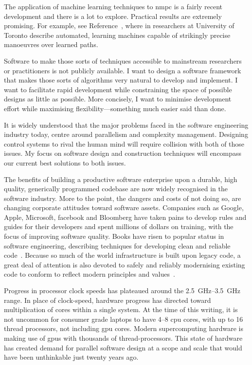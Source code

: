 The application of machine learning techniques to \ac{nmpc} is a fairly recent
development and there is a lot to explore. Practical results are extremely
promising. For example, see Reference~\cite{Ostafew2016}, where in researchers
at University of Toronto describe automated, learning machines capable of
strikingly precise manoeuvres over learned paths.

Software to make those sorts of techniques accessible to mainstream researchers
or practitioners is not publicly available. I want to design a software
framework that makes those sorts of algorithms very natural to develop and
implement. I want to facilitate rapid development while constraining the space
of possible designs as little as possible. More concisely, I want to minimise
development effort while maximising flexibility—something much easier said than
done.

It is widely understood that the major problems faced in the software
engineering industry today, centre around parallelism and complexity management.
Designing control systems to rival the human mind will require collision with
both of those issues. My focus on software design and construction techniques
will encompass our current best solutions to both issues.



\sAsterism%


The benefits of building a productive software enterprise upon a durable, high
quality, generically programmed codebase are now widely recognised in the
software industry. More to the point, the dangers and costs of not doing so, are
changing corporate attitudes toward software assets. Companies such as Google,
Apple, Microsoft, facebook and Bloomberg have taken pains to develop rules and
guides for their developers and spent millions of dollars on training, with the
focus of improving software quality. Books have risen to popular status in
software engineering, describing techniques for developing clean and reliable
code~\cite[for
examples]{McConnell2004,Martin2009,Beck2003,Beck2007,McConnell2004}. Because so
much of the world infrastructure is built upon legacy code, a great deal of
attention is also devoted to safely and reliably modernising existing code to
conform to reflect modern principles and values~\cite{Fowler1999,Feathers2004}.

Progress in processor clock speeds has plateaued around the
\SIrange{2.5}{3.5}{\giga\hertz} range. In place of clock-speed, hardware
progress has directed toward multiplication of cores within a single system. At
the time of this writing, it is not uncommon for consumer grade laptops to have
\numrange{4}{8} \ac{cpu} cores, with
up to 16 thread processors, not including \ac{gpu} cores. Modern supercomputing
hardware is making use of \acp{gpu}
with thousands of thread-processors. This state of hardware has created demand
for parallel software design at a scope and scale that would have been
unthinkable just twenty years ago.

